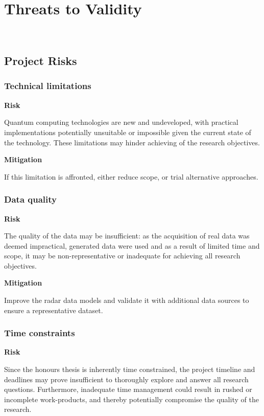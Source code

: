 \section{Threats to Validity}~\label{sec:threats}

\subsection{Project Risks}

\subsubsection{Technical limitations}

\textbf{Risk}

Quantum computing technologies are new and undeveloped, with practical implementations potentially unsuitable or impossible given the current state of the technology. These limitations may hinder achieving of the research objectives.

\textbf{Mitigation}

If this limitation is affronted, either reduce scope, or trial alternative approaches.
% 
\subsubsection{Data quality}

\textbf{Risk}

The quality of the data may be insufficient: as the acquisition of real data was deemed impractical, generated data were used and as a result of limited time and scope, it may be non-representative or inadequate for achieving all research objectives. 

\textbf{Mitigation}

Improve the radar data models and validate it with additional data sources to ensure a representative dataset. 
% 
\subsubsection{Time constraints}

\textbf{Risk}

Since the honours thesis is inherently time constrained, the project timeline and deadlines may prove insufficient to thoroughly explore and answer all research questions.
Furthermore, inadequate time management could result in rushed or incomplete work-products, and thereby potentially compromise the quality of the research.

